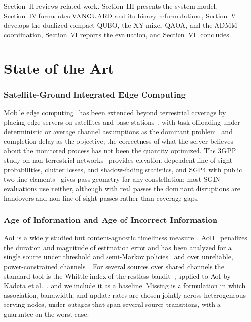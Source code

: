 Section~II reviews related work. Section~III presents the system model, Section~IV formulates VANGUARD and its
binary reformulations, Section~V develops the dualized compact QUBO, the XY-mixer QAOA, and the ADMM coordination,
Section~VI reports the evaluation, and Section~VII concludes.

\section{State of the Art}

\subsubsection{Satellite-Ground Integrated Edge Computing}
Mobile edge computing~\cite{Mao2017} has been extended beyond terrestrial coverage by placing edge servers on
satellites and base stations~\cite{Liu2018, Kato2019, Zhang2019}, with task offloading under deterministic or
average channel assumptions as the dominant problem~\cite{Cheng2019, Zhou2021} and completion delay as the objective;
the correctness of what the server believes about the monitored process has not been the quantity optimized. The
3GPP study on non-terrestrial networks~\cite{TR38811} provides elevation-dependent line-of-sight probabilities,
clutter losses, and shadow-fading statistics, and SGP4 with public two-line elements~\cite{Vallado2006} gives pass
geometry for any constellation; most SGIN evaluations use neither, although with real passes the dominant
disruptions are handovers and non-line-of-sight passes rather than coverage gaps.

\subsubsection{Age of Information and Age of Incorrect Information}
AoI is a widely studied but content-agnostic timeliness measure~\cite{Kaul2012, Kosta2017, Sun2017, Kadota2018,
Yates2021}. AoII~\cite{Maatouk2020} penalizes the duration and magnitude of estimation error and has been analyzed
for a single source under threshold and semi-Markov policies~\cite{Maatouk2023, Kriouile2021} and over unreliable,
power-constrained channels~\cite{Chen2021}. For several sources over shared channels the standard tool is the Whittle
index of the restless bandit~\cite{Whittle1988}, applied to AoI by Kadota et al.~\cite{Kadota2018}, and we include
it as a baseline. Missing is a formulation in
which association, bandwidth, and update rates are chosen jointly across heterogeneous serving nodes, under outages
that span several source transitions, with a guarantee on the worst case.

